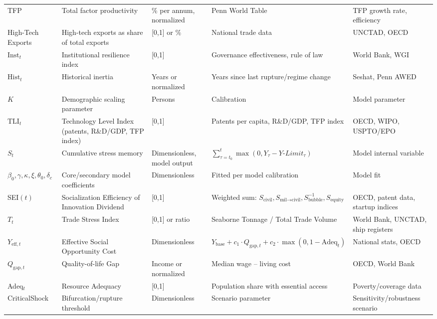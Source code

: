 \documentclass[12pt]{article}
\begin{document}
\begin{longtable}{|p{2.8cm}|p{4.3cm}|p{2.0cm}|p{3.0cm}|p{3.0cm}|}
TFP & Total factor productivity & \% per annum, normalized & Penn World Table & TFP growth rate, efficiency \\
High-Tech Exports & High-tech exports as share of total exports & [0,1] or \% & National trade data & UNCTAD, OECD \\
$\text{Inst}_t$ & Institutional resilience index & [0,1] & Governance effectiveness, rule of law & World Bank, WGI \\
$\text{Hist}_t$ & Historical inertia & Years or normalized & Years since last rupture/regime change & Seshat, Penn AWED \\
$K$ & Demographic scaling parameter & Persons & Calibration & Model parameter \\
$\text{TLI}_t$ & Technology Level Index (patents, R\&D/GDP, TFP index) & [0,1] & Patents per capita, R\&D/GDP, TFP index & OECD, WIPO, USPTO/EPO \\
$S_t$ & Cumulative stress memory & Dimensionless, model output & $\sum_{\tau=t_0}^t \max(0, Y_\tau - Y\text{-}Limit_\tau)$ & Model internal variable \\
$\beta_0, \gamma, \kappa, \xi, \theta_0, \delta_c$ & Core/secondary model coefficients & Dimensionless & Fitted per model calibration & Model fit \\
SEI$(t)$ & Socialization Efficiency of Innovation Dividend & [0,1] & Weighted sum: $S_\text{civil}, S_{\text{mil}\rightarrow\text{civil}}, S_\text{bubble}^{-1}, S_\text{equity}$ & OECD, patent data, startup indices \\
$T_t$ & Trade Stress Index & [0,1] or ratio & Seaborne Tonnage / Total Trade Volume & World Bank, UNCTAD, ship registers \\
$Y_{\text{eff},t}$ & Effective Social Opportunity Cost & Dimensionless & $Y_{\text{base}} + c_1 \cdot Q_{\text{gap},t} + c_2 \cdot \max(0,1 - \text{Adeq}_t)$ & National stats, OECD \\
$Q_{\text{gap},t}$ & Quality-of-life Gap & Income or normalized & Median wage – living cost & OECD, World Bank \\
Adeq$_t$ & Resource Adequacy & [0,1] & Population share with essential access & Poverty/coverage data \\
CriticalShock & Bifurcation/rupture threshold & Dimensionless & Scenario parameter & Sensitivity/robustness scenario \\
\end{longtable}
\end{document}
